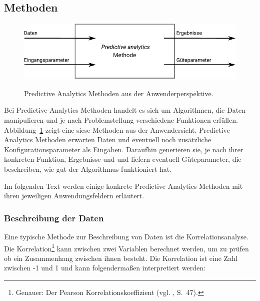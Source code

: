 \subsection{Methoden}

\begin{figure}%
\centering
\caption{Predictive Analytics Methoden aus der Anwenderperspektive.}
\includegraphics[scale=1.0]{Grafiken/PA_Methoden_Ink.pdf} 
\label{pic:PA_Methoden}
\end{figure}

Bei Predictive Analytics Methoden handelt es sich um Algorithmen, die Daten manipulieren und
je nach Problemstellung verschiedene Funktionen erfüllen. Abbildung~\ref{pic:PA_Methoden} zeigt eine
siese Methoden aus der Anwendersicht. Predictive Analytics Methoden erwarten Daten und eventuell noch zusätzliche
Konfigurationsparameter als Eingaben. Daraufhin generieren sie, je nach ihrer konkreten Funktion, Ergebnisse und
und liefern eventuell Güteparameter, die beschreiben, wie gut der Algorithmus funktioniert hat.

Im folgenden Text werden einige konkrete Predictive Analytics Methoden mit ihren jeweiligen Anwendungsfeldern
erläutert. 

\subsubsection{Beschreibung der Daten}

Eine typische Methode zur Beschreibung von Daten ist die Korrelationsanalyse.
Die Korrelation\footnote{
Genauer: Der Pearson Korrelationskoeffizient (vgl. \cite{Bowles}, S.~47).
} kann zwischen zwei Variablen berechnet werden, um zu prüfen ob ein Zusammenhang zwischen ihnen besteht.
Die Korrelation ist eine Zahl zwischen -1 und 1 und kann folgendermaßen interpretiert werden:

